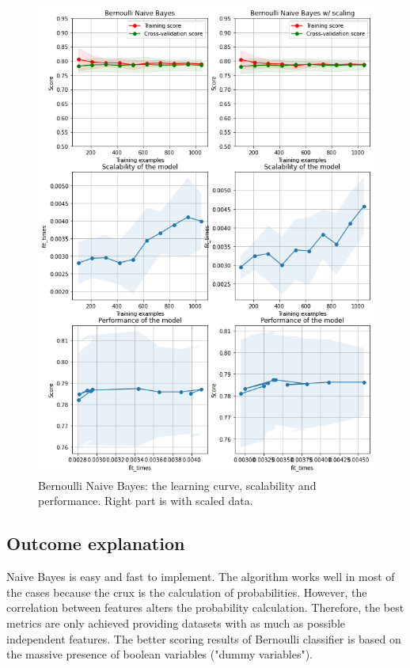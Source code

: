 \documentclass{article}
\begin{document}
\begin{figure}[H]
	\includegraphics[width=\textwidth,height=\textheight,keepaspectratio]{bernoulliNB_curve.png}
	\caption{Bernoulli Naive Bayes: the learning curve, scalability and performance. Right part is with scaled data.}
	\label{fig:Bernoulli-curve}
\end{figure}

\subsection{Outcome explanation}
Naive Bayes is easy and fast to implement. The algorithm works well in most of the cases because the crux is the calculation of probabilities. However, the correlation between features alters the probability calculation. Therefore, the best metrics are only achieved providing datasets with as much as possible independent features. The better scoring results of Bernoulli classifier is based on the massive presence of boolean variables ("dummy variables").
\end{document}
